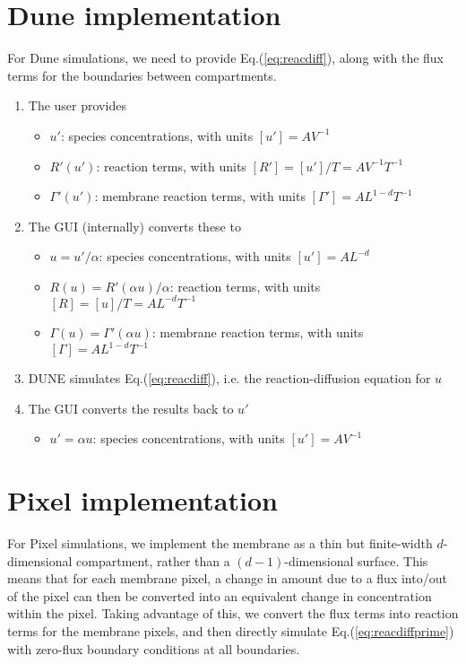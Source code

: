 \documentclass{article}
\begin{document}
\section{Dune implementation}

For Dune simulations, we need to provide Eq.(\ref{eq:reacdiff}),
along with the flux terms for the boundaries between compartments.

\begin{enumerate}
\item The user provides
\begin{itemize}
    \item $u'$: species concentrations, with units $[u'] = A V^{-1}$
    \item $R'(u')$: reaction terms, with units $[R'] = [u']/T = A V^{-1} T^{-1}$
    \item $\Gamma'(u')$: membrane reaction terms, with units $[\Gamma'] = A L^{1-d} T^{-1}$
\end{itemize}
\item The GUI (internally) converts these to
\begin{itemize}
    \item $u = u' / \alpha$: species concentrations, with units $[u'] = A L^{-d}$
    \item $R(u) = R'(\alpha u) / \alpha$: reaction terms, with units $[R] = [u]/T = A L^{-d} T^{-1}$
    \item $\Gamma(u) = \Gamma'(\alpha u)$: membrane reaction terms, with units $[\Gamma] = A L^{1-d} T^{-1}$
\end{itemize}
\item DUNE simulates Eq.(\ref{eq:reacdiff}), i.e. the reaction-diffusion equation for $u$
\item The GUI converts the results back to $u'$
\begin{itemize}
    \item $u' = \alpha u$: species concentrations, with units $[u'] = A V^{-1}$
\end{itemize}
\end{enumerate}

\section{Pixel implementation}
For Pixel simulations, we implement the membrane as a thin but finite-width $d$-dimensional compartment, rather than a $(d-1)$-dimensional surface.
This means that for each membrane pixel, a change in amount due to a flux into/out of the pixel can then be converted into an equivalent change in concentration within the pixel.
Taking advantage of this, we convert the flux terms into reaction terms for the membrane pixels,
and then directly simulate Eq.(\ref{eq:reacdiffprime}) with zero-flux boundary conditions at all boundaries.
\end{document}
